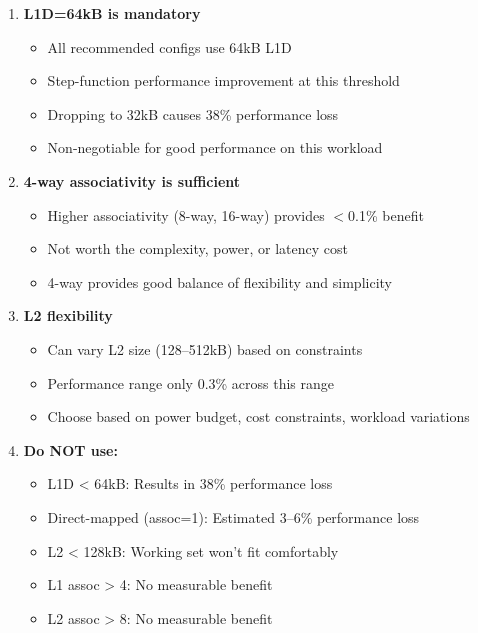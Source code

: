 \documentclass[11pt,a4paper]{article}
\begin{document}
\begin{enumerate}[noitemsep]
    \item \textbf{L1D=64kB is mandatory}
    \begin{itemize}[noitemsep]
        \item All recommended configs use 64kB L1D
        \item Step-function performance improvement at this threshold
        \item Dropping to 32kB causes 38\% performance loss
        \item Non-negotiable for good performance on this workload
    \end{itemize}

    \item \textbf{4-way associativity is sufficient}
    \begin{itemize}[noitemsep]
        \item Higher associativity (8-way, 16-way) provides $<$0.1\% benefit
        \item Not worth the complexity, power, or latency cost
        \item 4-way provides good balance of flexibility and simplicity
    \end{itemize}

    \item \textbf{L2 flexibility}
    \begin{itemize}[noitemsep]
        \item Can vary L2 size (128--512kB) based on constraints
        \item Performance range only 0.3\% across this range
        \item Choose based on power budget, cost constraints, workload variations
    \end{itemize}

    \item \textbf{Do NOT use:}
    \begin{itemize}[noitemsep]
        \item L1D < 64kB: Results in 38\% performance loss
        \item Direct-mapped (assoc=1): Estimated 3--6\% performance loss
        \item L2 < 128kB: Working set won't fit comfortably
        \item L1 assoc > 4: No measurable benefit
        \item L2 assoc > 8: No measurable benefit
    \end{itemize}
\end{enumerate}
\end{document}
